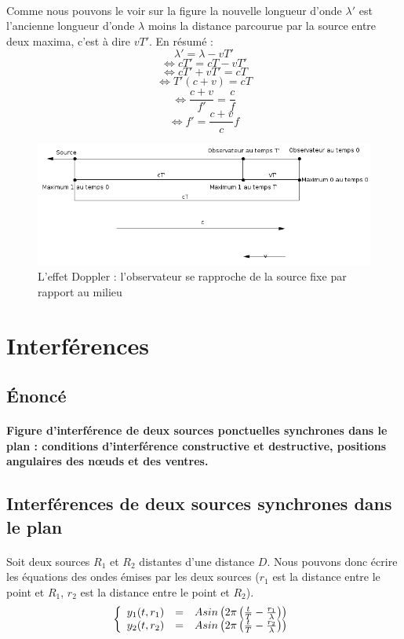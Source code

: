 \documentclass[a4paper]{article}
\begin{document}
\paragraph{}Comme nous pouvons le voir sur la figure la nouvelle longueur d'onde $\lambda'$ est l'ancienne longueur d'onde $\lambda$ moins la distance parcourue par la source entre deux maxima, c'est à dire $vT'$. En résumé :
\[\lambda'=\lambda-vT'\]
\[\Leftrightarrow cT'=cT-vT'\]
\[\Leftrightarrow cT'+vT'=cT\]
\[\Leftrightarrow T'(c+v)=cT\]
\[\Leftrightarrow \frac{c+v}{f'}=\frac{c}{f}\]
\[\Leftrightarrow f'=\frac{c+v}{c}f\]
\begin{figure}
\begin{center}
\includegraphics[width=15cm]{imgs/SfOa.png}
\end{center}
\caption{L'effet Doppler : l'observateur se rapproche de la source fixe par rapport au milieu}
\label{L'effet Doppler : l'observateur se rapproche de la source fixe par rapport au milieu}
\end{figure}
\section{Interférences}
\subsection{Énoncé}
\paragraph{}\textbf{Figure d'interférence de deux sources ponctuelles synchrones dans le plan : conditions d'interférence constructive et destructive, positions angulaires des nœuds et des ventres.}
\subsection{Interférences de deux sources synchrones dans le plan}
\paragraph{}Soit deux sources $R_1$ et $R_2$ distantes d'une distance $D$. Nous pouvons donc écrire les équations des ondes émises par les deux sources ($r_1$ est la distance entre le point et $R_1$, $r_2$ est la distance entre le point et $R_2$).
\[
\left\{
\begin{array}{r c l}
y_1(t,r_1) &=& Asin\left(2\pi\left(\frac{t}{T}-\frac{r_1}{\lambda}\right)\right)\\
y_2(t,r_2) &=& Asin\left(2\pi\left(\frac{t}{T}-\frac{r_2}{\lambda}\right)\right)\\
\end{array}
\right.
\]
\end{document}
